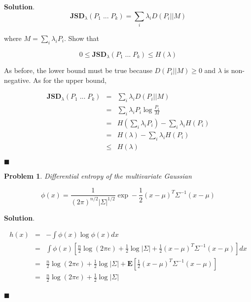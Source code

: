 \documentclass[12pt]{article}
\newtheorem{p}{Problem}[section]
\theoremstyle{definition}
\newenvironment{s}{%
        \begin{trivlist} \item \textbf{Solution}. }{%
            \hspace*{\fill} $\blacksquare$\end{trivlist}}%
\begin{document}
{\begin{s}
\begin{equation*}
\mathbf{JSD}_{\lambda}(P_{1} \; ... \; P_{k}) =  \sum_{i} \lambda_{i}D(P_{i}||M)
\end{equation*}

where $M = \sum_{i} \lambda_{i}P_{i}$. Show that 

\begin{equation*}
0 \leq \mathbf{JSD}_{\lambda}(P_{1} \; ... \; P_{k}) \leq H(\lambda)
\end{equation*}

As before, the lower bound must be true because $D(P_{i}||M) \geq 0$ and $\lambda$ is non-negative. As for the upper bound,

\begin{eqnarray*}
\mathbf{JSD}_{\lambda}(P_{1} \; ... \; P_{k}) &=&  \sum_{i} \lambda_{i}D(P_{i}||M)\\
&=& \sum_{i} \lambda_{i}P_{i} \log \frac{P_{i}}{M}\\
&=& H(\sum_{i} \lambda_{i}P_{i}) - \sum_{i}\lambda_{i}H(P_{i})\\
&=& H(\lambda) - \sum_{i}\lambda_{i}H(P_{i})\\
&\leq & H(\lambda)
\end{eqnarray*}

\end{s}

\begin{p}
Differential entropy of the multivariate Gaussian

\begin{equation*}
\phi(x) = \frac{1}{(2\pi)^{n/2}|\Sigma|^{1/2}}\exp-\frac{1}{2}(x-\mu)^{T}\Sigma^{-1}(x-\mu)
\end{equation*}

\end{p}

\begin{s}


\begin{eqnarray*}
h(x) &=& -\int \phi(x)\log \phi(x) dx\\
&=& \int \phi(x) \left[\frac{n}{2}\log (2\pi e) +\frac{1}{2} \log|\Sigma| + \frac{1}{2}(x-\mu)^{T}\Sigma^{-1}(x-\mu)\right]dx\\
&=& \frac{n}{2}\log (2\pi e) +\frac{1}{2} \log|\Sigma| + \mathbf{E}\left[\frac{1}{2}(x-\mu)^{T}\Sigma^{-1}(x-\mu)\right]\\
&=& \frac{n}{2}\log (2\pi e) +\frac{1}{2} \log|\Sigma|\\
\end{eqnarray*}

\end{s}
\end{document}
